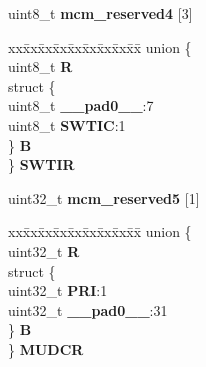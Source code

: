 \begin{DoxyCompactItemize}
\begin{tabbing}
\end{tabbing}\item 
\mbox{\label{structMCM__tag_a428776ab2287d971dd72a3fc924dd51b}} 
uint8\+\_\+t {\bfseries mcm\+\_\+reserved4} \mbox{[}3\mbox{]}
\item 
\mbox{\label{structMCM__tag_a33542f6a8ae5c0fcbb2f8ec29cb26c93}} 
\begin{tabbing}
xx\=xx\=xx\=xx\=xx\=xx\=xx\=xx\=xx\=\kill
union \{\\
\>uint8\_t {\bfseries R}\\
\>struct \{\\
\>\>uint8\_t {\bfseries \_\_pad0\_\_}:7\\
\>\>uint8\_t {\bfseries SWTIC}:1\\
\>\} {\bfseries B}\\
\} {\bfseries SWTIR}\\

\end{tabbing}\item 
\mbox{\label{structMCM__tag_a8ea08dc76efd35b4ea4d0f4a674e17df}} 
uint32\+\_\+t {\bfseries mcm\+\_\+reserved5} \mbox{[}1\mbox{]}
\item 
\mbox{\label{structMCM__tag_a341dc10017e7d9f58b4b73fab51ae8ee}} 
\begin{tabbing}
xx\=xx\=xx\=xx\=xx\=xx\=xx\=xx\=xx\=\kill
union \{\\
\>uint32\_t {\bfseries R}\\
\>struct \{\\
\>\>uint32\_t {\bfseries PRI}:1\\
\>\>uint32\_t {\bfseries \_\_pad0\_\_}:31\\
\>\} {\bfseries B}\\
\} {\bfseries MUDCR}\\


\end{tabbing}
\end{DoxyCompactItemize}
